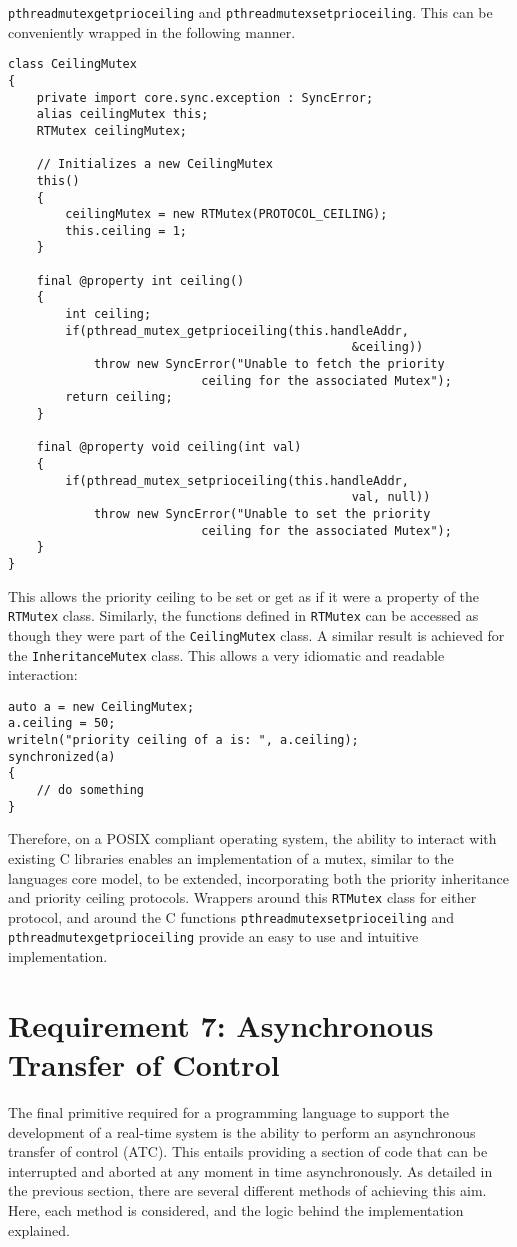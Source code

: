 \texttt{pthread\textunderscore{}mutex\textunderscore{}getprioceiling} and 
\texttt{pthread\textunderscore{}mutex\textunderscore{}setprioceiling}.
This can be conveniently wrapped in the following manner. 
\begin{lstlisting}
class CeilingMutex 
{
    private import core.sync.exception : SyncError;
    alias ceilingMutex this;
    RTMutex ceilingMutex;

    // Initializes a new CeilingMutex
    this()
    {
        ceilingMutex = new RTMutex(PROTOCOL_CEILING);
        this.ceiling = 1;
    }

    final @property int ceiling()
    {
        int ceiling; 
        if(pthread_mutex_getprioceiling(this.handleAddr, 
                                                &ceiling))
            throw new SyncError("Unable to fetch the priority 
                           ceiling for the associated Mutex"); 
        return ceiling; 
    }

    final @property void ceiling(int val)
    {
        if(pthread_mutex_setprioceiling(this.handleAddr, 
                                                val, null))
            throw new SyncError("Unable to set the priority 
                           ceiling for the associated Mutex"); 
    }
}
\end{lstlisting}
This allows the priority ceiling to be set or get as if it were a property of 
the \texttt{RTMutex} class. Similarly, the functions defined in \texttt{RTMutex} 
can be accessed as though they were part of the \texttt{CeilingMutex} class. 
A similar result is achieved for the \texttt{InheritanceMutex} class.
This allows a very idiomatic and readable interaction: 
\begin{lstlisting}
auto a = new CeilingMutex;
a.ceiling = 50; 
writeln("priority ceiling of a is: ", a.ceiling); 
synchronized(a) 
{
    // do something
}
\end{lstlisting}
Therefore, on a POSIX compliant operating system, the ability to interact with 
existing C libraries enables an implementation of a mutex, similar to the languages 
core model, to be extended, incorporating both the priority inheritance and 
priority ceiling protocols. Wrappers around this \texttt{RTMutex} class for 
either protocol, and around the C functions 
\texttt{pthread\textunderscore{}mutex\textunderscore{}setprioceiling} 
and \texttt{pthread\textunderscore{}mutex\textunderscore{}getprioceiling{}} 
provide an easy to use and intuitive implementation. 

\section{Requirement 7: Asynchronous Transfer of Control} %
The final primitive required for a programming language to support the development 
of a real-time system is the ability to perform an asynchronous transfer of 
control (ATC). This entails providing a section of code that can be interrupted 
and aborted at any moment in time asynchronously.
As detailed in the previous section, there are several different methods of 
achieving this aim. Here, each method is considered, and the logic behind the 
implementation explained. 

